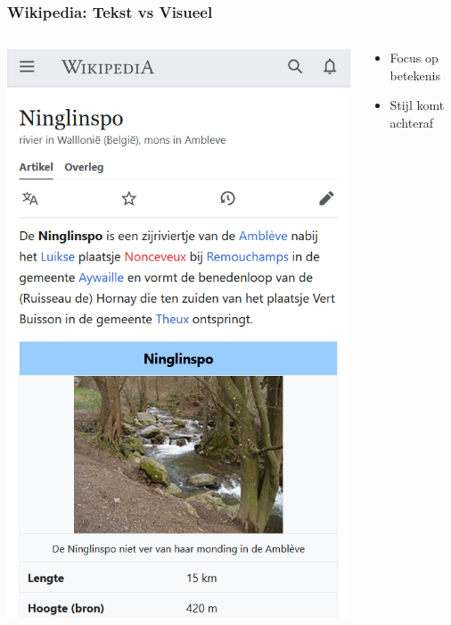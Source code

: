 \documentclass[presentatie.tex]{subfiles}
\begin{document}
    
    \begin{frame}
        \frametitle{Wikipedia: Tekst vs Visueel}
        \begin{columns}
            \begin{column}{0.5\textwidth}
                \centering
                \includegraphics[width=\linewidth,height=0.7\textheight,keepaspectratio]{assets/wikipediaVisual}
            \end{column}
            \begin{column}{0.5\textwidth}
                \begin{itemize}
                    \item Focus op betekenis
                    \item Stijl komt achteraf
                \end{itemize}


\end{column}
\end{columns}
\end{frame}
\end{document}

